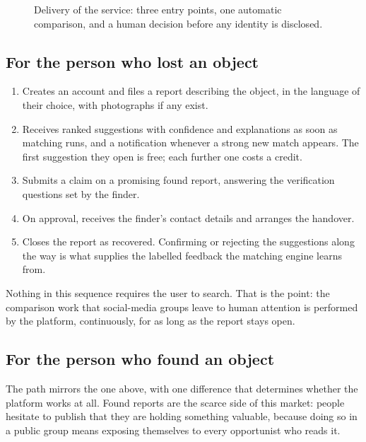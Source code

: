 \begin{figure}[htbp]
\begin{tikzpicture}[x=1cm,y=1cm]
\end{tikzpicture}
\caption{Delivery of the service: three entry points, one automatic comparison,
and a human decision before any identity is disclosed.}
\label{fig:service-process}
\end{figure}

\subsection{For the person who lost an object}

\begin{enumerate}[leftmargin=1.6em,itemsep=3pt]
  \item Creates an account and files a report describing the object, in the
        language of their choice, with photographs if any exist.
  \item Receives ranked suggestions with confidence and explanations as soon as
        matching runs, and a notification whenever a strong new match appears.
        The first suggestion they open is free; each further one costs a
        credit.
  \item Submits a claim on a promising found report, answering the verification
        questions set by the finder.
  \item On approval, receives the finder's contact details and arranges the
        handover.
  \item Closes the report as recovered. Confirming or rejecting the
        suggestions along the way is what supplies the labelled feedback the
        matching engine learns from.
\end{enumerate}

Nothing in this sequence requires the user to search. That is the point: the
comparison work that social-media groups leave to human attention is performed
by the platform, continuously, for as long as the report stays open.

\subsection{For the person who found an object}

The path mirrors the one above, with one difference that determines whether the
platform works at all. Found reports are the scarce side of this market: people
hesitate to publish that they are holding something valuable, because doing so
in a public group means exposing themselves to every opportunist who reads it.

